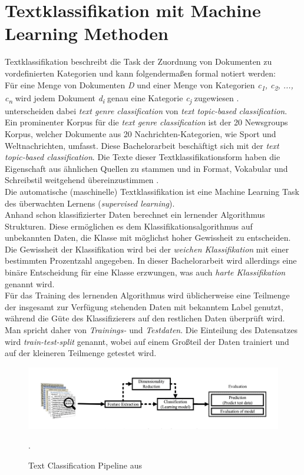\documentclass[ngerman]{ttlab-qualify}
\begin{document}
\section{Textklassifikation mit Machine Learning Methoden} \label{tc_pipeline}
Textklassifikation beschreibt die Task der Zuordnung von Dokumenten zu vordefinierten Kategorien und kann folgendermaßen formal notiert werden:\\
Für eine Menge von Dokumenten \textit{D} und einer Menge von Kategorien \textit{{c\textsubscript{1}, c\textsubscript{2}, ..., c\textsubscript{n}}} wird jedem Dokument \textit{d\textsubscript{i}} genau eine Kategorie \textit{c\textsubscript{j}} zugewiesen \parencite[vgl. S. 1]{ikonomakis}.\\
\textcite{ikonomakis} unterscheiden dabei \textit{text genre classification} von \textit{text topic-based classification}. Ein prominenter Korpus für die \textit{text genre classification} ist der 20 Newsgroups Korpus, welcher Dokumente aus 20 Nachrichten-Kategorien, wie Sport und Weltnachrichten, umfasst. Diese Bachelorarbeit beschäftigt sich mit der \textit{text topic-based classification}. Die Texte dieser Textklassifikationsform haben die Eigenschaft aus ähnlichen Quellen zu stammen und in Format, Vokabular und Schreibstil weitgehend übereinzustimmen \parencite{ikonomakis}.\\
Die automatische (maschinelle) Textklassifikation ist eine Machine Learning Task des überwachten Lernens (\textit{supervised learning}).\\
Anhand schon klassifizierter Daten berechnet ein lernender Algorithmus Strukturen. Diese ermöglichen es dem Klassifikationsalgorithmus auf unbekannten Daten, die Klasse mit möglichst hoher Gewissheit zu entscheiden. Die Gewissheit der Klassifikation wird bei der \textit{weichen Klassifikation} mit einer bestimmten Prozentzahl angegeben. In dieser Bachelorarbeit wird allerdings eine binäre Entscheidung für eine Klasse erzwungen, was auch \textit{harte Klassifikation} genannt wird.\\
Für das Training des lernenden Algorithmus wird üblicherweise eine Teilmenge der insgesamt zur Verfügung stehenden Daten mit bekanntem Label genutzt, während die Güte des Klassifizierers auf den restlichen Daten überprüft wird. Man spricht daher von \textit{Trainings-} und \textit{Testdaten}. Die Einteilung des Datensatzes wird  \textit{train-test-split} genannt, wobei auf einem Großteil der Daten trainiert und auf der kleineren Teilmenge getestet wird.
\begin{figure}[H]
\begin{center}
\includegraphics[width=14cm]{grafiken/text_classification_pipeline_kowsari.jpeg}
\caption[Text Classification Pipeline]{Text Classification Pipeline aus \textcite[S. 2]{Kowsari_2019}}.
\label{Pipeline}
\end{center}
\end{figure}
\end{document}
